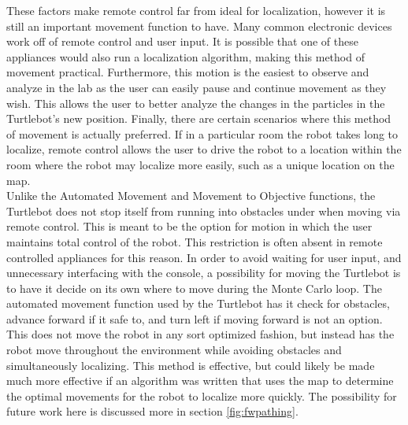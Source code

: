 \documentclass{article}
\newcommand\tab[1][0.5cm]{\hspace*{#1}}
\newcounter{subsubsubsection}[subsubsection]
\begin{document}
These factors make remote control far from ideal for localization, however it is still an important movement function to have. Many common electronic devices work off of remote control and user input. It is possible that one of these appliances would also run a localization algorithm, making this method of movement practical. Furthermore, this motion is the easiest to observe and analyze in the lab as the user can easily pause and continue movement as they wish. This allows the user to better analyze the changes in the particles in the Turtlebot's new position. Finally, there are certain scenarios where this method of movement is actually preferred. If in a particular room the robot takes long to localize, remote control allows the user to drive the robot to a location within the room where the robot may localize more easily, such as a unique location on the map.\\

Unlike the Automated Movement and Movement to Objective functions, the Turtlebot does not stop itself from running into obstacles under when moving via remote control. This is meant to be the option for motion in which the user maintains total control of the robot. This restriction is often absent in remote controlled appliances for this reason.
\label{fig:autom}
\tab In order to avoid waiting for user input, and unnecessary interfacing with the console, a possibility for moving the Turtlebot is to have it decide on its own where to move during the Monte Carlo loop. The automated movement function used by the Turtlebot has it check for obstacles, advance forward if it safe to, and turn left if moving forward is not an option. This does not move the robot in any sort optimized fashion, but instead has the robot move throughout the environment while avoiding obstacles and simultaneously localizing. This method is effective, but could likely be made much more effective if an algorithm was written that uses the map to determine the optimal movements for the robot to localize more quickly. The possibility for future work here is discussed more in section \ref{fig:fwpathing}.\\
\end{document}
